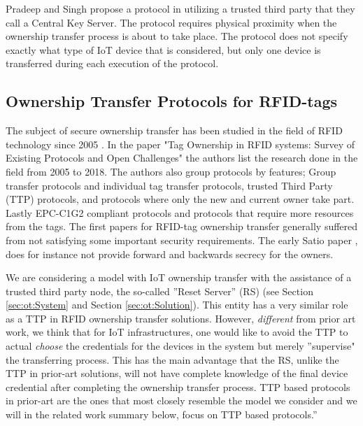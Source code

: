 {Pradeep and Singh propose a protocol in \cite{Pradeep2013} utilizing a trusted third party that they call a Central Key Server. The protocol requires physical proximity when the ownership transfer process is about to take place. The protocol does not specify exactly what type of IoT device that is considered, but only one device is transferred during each execution of the protocol.

\subsection{Ownership Transfer Protocols for RFID-tags}
The subject of secure ownership transfer has been studied in the field of RFID technology since 2005 \cite{saito2005reassignment}. In the paper "Tag Ownership in RFID systems: Survey of Existing Protocols and Open Challenges"\cite{taqieddin2018tag} the authors list the research done in the field from 2005 to 2018. The authors also group protocols by features; Group transfer protocols and individual tag transfer protocols, trusted Third Party (TTP) protocols, and protocols where only the new and current owner take part. Lastly EPC-C1G2 \cite{epc-c1g2} compliant protocols and protocols that require more resources from the tags. The first papers for RFID-tag ownership transfer generally suffered from not satisfying some important security requirements. The early Satio paper \cite{saito2005reassignment}, does for instance not provide forward and backwards secrecy for the owners. 

We are considering a model with IoT ownership transfer with the assistance of a trusted third party node, the so-called ''Reset Server'' (RS) (see Section \ref{sec:ot:System} and Section \ref{sec:ot:Solution}). This entity has a very similar role as a TTP in RFID ownership transfer solutions. However, {\em different} from prior art work, we think that for IoT infrastructures, one would like to avoid the TTP to actual {\em choose} the credentials for the devices in the system but merely ''supervise" the transferring process. This has the main advantage that the RS, unlike the TTP in prior-art solutions, will not have complete knowledge of the final device credential after completing the ownership transfer process. TTP based protocols in prior-art are the ones that most closely resemble the model we consider and we will in the related work summary below, focus on TTP based protocols.” 

}
